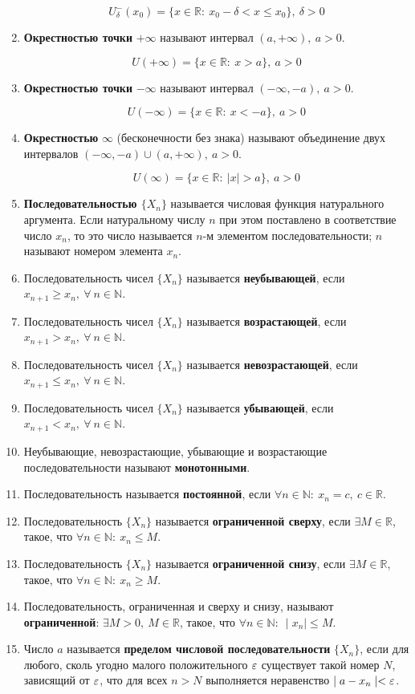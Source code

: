 \begin{enumerate}
$$U^-_{\delta}(x_0) = \{x \in \mathbb{R}: \ x_0 -\delta < x \leqslant x_0\},\ \delta > 0$$
\item \textbf{Окрестностью точки} $+\infty$ называют интервал $(a, +\infty), \ a > 0$.

$$U(+\infty) = \{x \in \mathbb{R}: \ x > a\}, \ a > 0$$
\item \textbf{Окрестностью точки} $-\infty$ называют интервал $(-\infty, -a), \ a > 0$.

$$U(-\infty) = \{x \in \mathbb{R}: \ x < -a\}, \ a > 0$$
\item \textbf{Окрестностью} $\infty$ (бесконечности без знака) называют объединение двух интервалов $(-\infty, -a) \cup (a, +\infty),\ a > 0$.

$$U(\infty) = \{x \in \mathbb{R}: \ | x | > a\}, \ a > 0$$
\item \textbf{Последовательностью $\{X_n\}$} называется числовая функция натурального аргумента. Если натуральному числу $n$ при этом поставлено в соответствие число $x_n$, то это число называется $n$-м элементом последовательности; $n$ называют номером элемента $x_n$.
\item Последовательность чисел $\{X_n\}$ называется \textbf{неубывающей}, если $x_{n+1}\geqslant x_n, \ \forall\ n \in \mathbb{N}$.
\item Последовательность чисел $\{X_n\}$ называется \textbf{возрастающей}, если $x_{n+1} > x_n, \ \forall\ n \in \mathbb{N}$.
\item Последовательность чисел $\{X_n\}$ называется \textbf{невозрастающей}, если $x_{n+1} \leqslant x_n, \ \forall\ n \in \mathbb{N}$.
\item Последовательность чисел $\{X_n\}$ называется \textbf{убывающей}, если $x_{n+1} < x_n, \ \forall\ n \in \mathbb{N}$.
\item Неубывающие, невозрастающие, убывающие и возрастающие последовательности называют \textbf{монотонными}.
\item Последовательность называется \textbf{постоянной}, если $ \forall n \in \mathbb{N}: \ x_n = c, \ c \in \mathbb{R}$.
\item Последовательность $\{X_n\}$ называется \textbf{ограниченной сверху}, если $\exists M \in \mathbb{R}$, такое, что $\forall n \in \mathbb{N}: \ x_n \leqslant M$.
\item Последовательность $\{X_n\}$ называется \textbf{ограниченной снизу}, если $\exists M \in \mathbb{R}$, такое, что $\forall n \in \mathbb{N}: \ x_n \geqslant M$.
\item Последовательность, ограниченная и сверху и снизу, называют \textbf{ограниченной}: $\exists M > 0, \ M \in \mathbb{R}$, такое, что $\forall n \in \mathbb{N}: \ \mid  x_n\mid   \leqslant M$.
\item Число $a$ называется \textbf{пределом числовой последовательности} $\{X_n\}$, если для любого, сколь угодно малого положительного ${\large\varepsilon}$ существует такой номер $N$, зависящий от ${\large\varepsilon}$, что для всех $n > N$ выполняется неравенство $\mid  a - x_n\mid   < {\large\varepsilon}$.


\end{enumerate}
